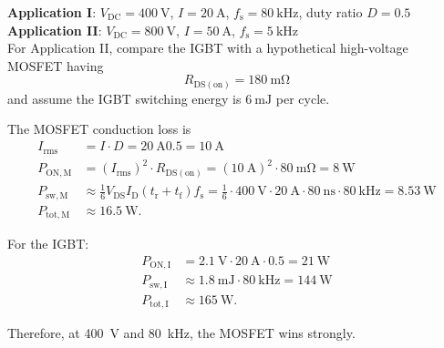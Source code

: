 \textbf{Application I}: $V_\mathrm{DC} = \SI{400}{\volt}$, $I = \SI{20}{\ampere}$, $f_\mathrm{s} = \SI{80}{\kilo\hertz}$, duty ratio $D = 0.5$ \\
\textbf{Application II}: $V_\mathrm{DC} = \SI{800}{\volt}$, $I = \SI{50}{\ampere}$, $f_\mathrm{s} = \SI{5}{\kilo\hertz}$ \\

For Application II, compare the IGBT with a hypothetical high-voltage MOSFET having
\begin{equation*}
    R_\mathrm{DS(on)} = \SI{180}{\milli\ohm}
\end{equation*}
and assume the IGBT switching energy is $\SI{6}{\milli\joule}$ per cycle.


\begin{solutionblock}
    The MOSFET conduction loss is
    \begin{align}
        I_\mathrm{rms} &= I \cdot D = \SI{20}{\ampere} 0.5 = \SI{10}{\ampere} \\
        P_\mathrm{ON,M} &= \left(I_\mathrm{rms}\right)^2 \cdot R_\mathrm{DS(on)} = \left( \SI{10}{\ampere} \right)^2 \cdot \SI{80}{\milli\ohm} = \SI{8}{\watt} \\
        P_\mathrm{sw,M} &\approx \frac{1}{6} V_\mathrm{DS} I_\mathrm{D} (t_\mathrm{r} + t_\mathrm{f}) f_\mathrm{s} =
                          \frac{1}{6} \cdot \SI{400}{\volt} \cdot \SI{20}{\ampere} \cdot \SI{80}{\nano\second} \cdot \SI{80}{\kilo\hertz} = \SI{8.53}{\watt} \\
        P_\mathrm{tot,M} &\approx \SI{16.5}{\watt}.
    \end{align}

    For the IGBT:
    \begin{align}
        P_\mathrm{ON,I} &= \SI{2.1}{\volt} \cdot \SI{20}{\ampere} \cdot 0.5 = \SI{21}{\watt} \\
        P_\mathrm{sw,I} &\approx \SI{1.8}{\milli\joule} \cdot \SI{80}{\kilo\hertz} = \SI{144}{\watt} \\
        P_\mathrm{tot,I} &\approx \SI{165}{\watt}.
    \end{align}

    Therefore, at \SI{400}{\volt} and \SI{80}{\kilo\hertz}, the MOSFET wins strongly.
\end{solutionblock}


